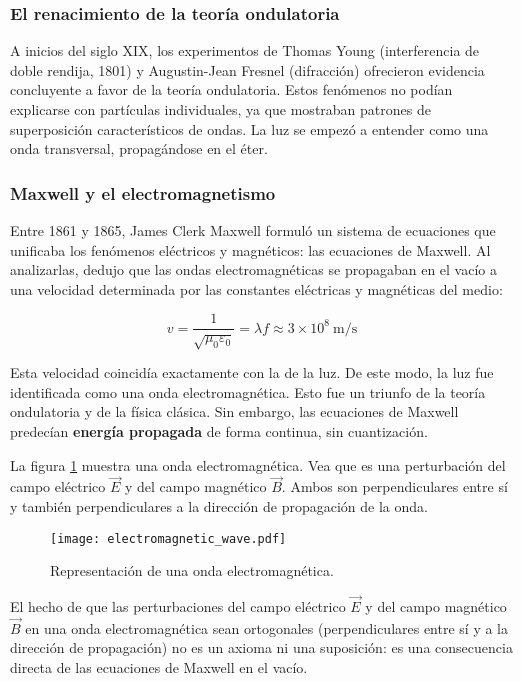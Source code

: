 \subsubsection{El renacimiento de la teoría ondulatoria}

A inicios del siglo XIX, los experimentos de Thomas Young (interferencia de doble rendija, 1801) y Augustin-Jean Fresnel (difracción) ofrecieron evidencia concluyente a favor de la teoría ondulatoria. Estos fenómenos no podían explicarse con partículas individuales, ya que mostraban patrones de superposición característicos de ondas. La luz se empezó a entender como una onda transversal, propagándose en el éter.

\subsubsection{Maxwell y el electromagnetismo}
\label{sec:maxwell_electromagnetismo}

Entre 1861 y 1865, James Clerk Maxwell formuló un sistema de ecuaciones que unificaba los fenómenos eléctricos y magnéticos: las ecuaciones de Maxwell. Al analizarlas, dedujo que las ondas electromagnéticas se propagaban en el vacío a una velocidad determinada por las constantes eléctricas y magnéticas del medio:

\[
v = \frac{1}{\sqrt{\mu_0 \varepsilon_0}} = \lambda f \approx 3 \times 10^8 \ \text{m/s}
\]

Esta velocidad coincidía exactamente con la de la luz. De este modo, la luz fue identificada como una onda electromagnética. Esto fue un triunfo de la teoría ondulatoria y de la física clásica. Sin embargo, las ecuaciones de Maxwell predecían \textbf{energía propagada} de forma continua, sin cuantización.

La figura \ref{fig:ond_electromagnetica} muestra una onda electromagnética. Vea que es una perturbación del campo eléctrico \(\vec{E}\) y del campo magnético \(\vec{B}\). Ambos son perpendiculares entre sí y también perpendiculares a la dirección de propagación de la onda.

\begin{figure}[ht]
  \centering
  \texttt{[image: electromagnetic\_wave.pdf]}
  \caption{Representación de una onda electromagnética.}
  \label{fig:ond_electromagnetica}
\end{figure}

El hecho de que las perturbaciones del campo eléctrico \(\vec{E}\) y del campo magnético \(\vec{B}\) en una onda electromagnética sean ortogonales (perpendiculares entre sí y a la dirección de propagación) no es un axioma ni una suposición: es una consecuencia directa de las ecuaciones de Maxwell en el vacío.

